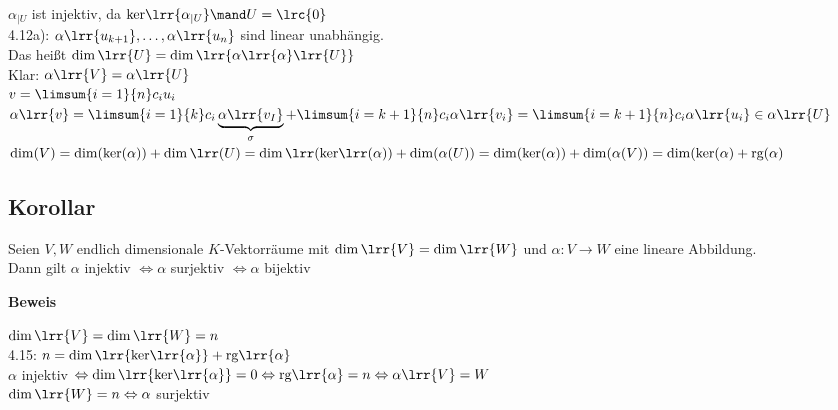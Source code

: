 	$\alpha_{\mid U}$ ist injektiv, da $\mbox{ker}\lrr{\alpha_{\mid U}}\mand U=\lrc{0}$\\
	4.12a): $\alpha\lrr{u_{k+1}},\dots,\alpha\lrr{u_n}$ sind linear unabhängig.\\
	Das heißt $\dim\lrr{U}=\dim\lrr{\alpha\lrr{\alpha}\lrr{U}}$\\
	Klar: $\alpha\lrr{V}=\alpha\lrr{U}$\\
	$v=\limsum{i=1}{n}c_iu_i$\\
	$\alpha\lrr{v}=\limsum{i=1}{k}c_i\underbrace{\alpha\lrr{v_I}}_{\scriptstyle\sigma}+\limsum{i=k+1}{n}c_i\alpha\lrr{v_i}=\limsum{i=k+1}{n}c_i\alpha\lrr{u_i}\in\alpha\lrr{U}$\\

	$\dim(V)=\dim(\mbox{ker}(\alpha))+\dim\lrr(U)=\dim\lrr(\mbox{ker}\lrr(\alpha))+\dim(\alpha(U))=\dim(\mbox{ker}(\alpha))+ \dim(\alpha(V))=\dim(\mbox{ker}(\alpha)+\mbox{rg}(\alpha)$

\subsection{Korollar}
	Seien $V,W$ endlich dimensionale $K$-Vektorräume mit $\dim\lrr{V}=\dim\lrr{W}$ und $\alpha:V\rightarrow W$ eine lineare Abbildung.\\
	Dann gilt $\alpha$ injektiv $\Leftrightarrow\alpha$ surjektiv $\Leftrightarrow\alpha$ bijektiv

	\textbf{Beweis}

	$\dim\lrr{V}=\dim\lrr{W}=n$\\
	4.15: $n=\dim\lrr{\mbox{ker}\lrr{\alpha}}+\mbox{rg}\lrr{\alpha}$\\
	$\alpha$ injektiv $\Leftrightarrow\dim\lrr{\mbox{ker}\lrr{\alpha}}=0\Leftrightarrow\mbox{rg}\lrr{\alpha}=n\Leftrightarrow\alpha\lrr{V}=W$\\
	$\dim\lrr{W}=n\Leftrightarrow\alpha$ surjektiv

